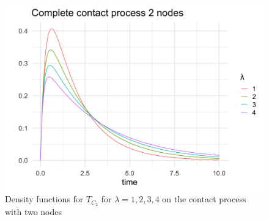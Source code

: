 \documentclass{article}
\theoremstyle{plain}
\theoremstyle{definition}
\theoremstyle{remark}
\numberwithin{equation}{section}
\begin{document}




\begin{figure}[H]
  \centering
    \includegraphics[width=.80\textwidth]{figures/complete_2_contact_phase_densities.png}
   \caption{Density functions for $T_{C_2}$ for $\lambda = 1, 2, 3, 4$ on the contact process with two nodes}
  \label{fig:contact_2_phase_densities}
\end{figure}
\end{document}
